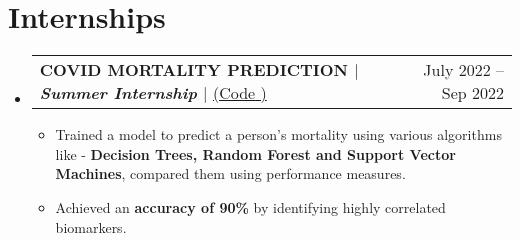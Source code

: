 \documentclass[letterpaper,11pt]{article}
\makeatletter
\newcommand{\resumeItem}[1]{
  \item\small{
    {#1 \vspace{-2pt}}
  }
}
\newcommand{\resumeProjectHeading}[2]{
    \item
    \begin{tabular*}{0.97\textwidth}{l@{\extracolsep{\fill}}r}
      \small#1 & #2 \\
    \end{tabular*}\vspace{-6pt}
}
\newcommand{\resumeSubHeadingListStart}{\begin{itemize}[leftmargin=0.15in, label={}]}
\newcommand{\resumeSubHeadingListEnd}{\end{itemize}}
\newcommand{\resumeItemListStart}{\begin{itemize}}
\newcommand{\resumeItemListEnd}{\end{itemize}\vspace{-6pt}}
\makeatother
\begin{document}
\section{Internships}
  \resumeSubHeadingListStart
      \resumeProjectHeading
          {\textbf{COVID MORTALITY PREDICTION $|$ \emph{Summer Internship} $|$}
          \href{https://github.com/GSK-10/Covid_Mortality_Prediction}{({Code} \faExternalLink*)
            }
          }{July 2022 -- Sep 2022}
          \resumeItemListStart
            \resumeItem{Trained a model to predict a person's mortality using various algorithms like - \textbf{Decision Trees, Random Forest and Support Vector Machines}, compared them using performance measures.}
            \resumeItem{Achieved an \textbf{accuracy of 90\%} by identifying highly correlated biomarkers.}
          \resumeItemListEnd
    \resumeSubHeadingListEnd

\end{document}
